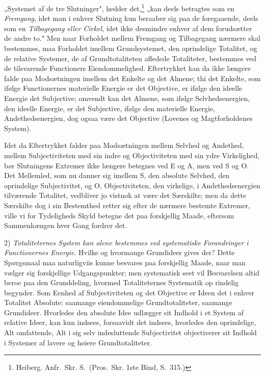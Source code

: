 \documentclass[12pt]{book}
\newcommand{\opage}[1]{\marginnote{\footnotesize\textit{[#1]}}}
\newcommand{\apage}[1]{\marginnote{\footnotesize\textit{[#1]}}}
\begin{document}
„Systemet af de tre Slutninger", hedder det,\footnote{Heiberg. Anfr.\ Skr. S.\ (Pros.\ Skr. 1ste
Bind, S.~315.)} „kan deels
\opage{434} betragtes som en \emph{Fremgang}, idet man i enhver Slutning kun beraaber sig paa de foregaaende,
deels som en \emph{Tilbagegang eller Cirkel}, idet ikke desmindre enhver af dem forudsætter de andre
to." Men naar Forholdet mellem Fremgang og Tilbagegang nærmere skal bestemmes, maa Forholdet imellem
Grundsystemet, den oprindelige Totalitet, og de relative Systemer, de af Grundtotaliteten afledede
Totaliteter, bestemmes ved de tilsvarende Functioners Eiendommelighed. Eftertrykket kan da ikke
længere falde paa Modsætningen imellem det Enkelte og det Almene; thi det Enkelte, som ifølge
Functionernes materielle Energie er det Objective, er ifølge den ideelle Energie det Subjective;
omvendt kan det Almene, som ifølge Selvhedsenergien, den ideelle Energie, er det Subjective, ifølge
den materielle Energie, Andethedsenergien, dog ogsaa være det Objective (Lovenes og
Magtforholdenes System).

Idet da Eftertrykket falder paa Modsætningen mellem Selvhed og Andethed, mellem Subjectiviteten med
sin indre og Objectiviteten med sin ydre Virkelighed, bør Slutningens Extremer ikke længere betegnes
ved E og A, men ved S og O. Det Mellemled, som nu danner sig imellem S, den absolute Selvhed, den
oprindelige Subjectivitet, og O, Objectiviteten, den virkelige, i Andethedsenergien tilværende
Totalitet, vedbliver jo vistnok at være det Særskilte; men da dette Særskilte dog i sin Bestemthed
retter sig efter de nærmere bestemte Extremer, ville vi for Tydeligheds Skyld betegne det paa
forskjellig Maade, eftersom Sammenhængen hver Gang fordrer det.

2) \emph{Totaliteternes System kan alene bestemmes ved systematiske Forandringer i Functionernes
Energie}. Hvilke og hvormange Grundideer gives der? Dette Spørgsmaal maa naturligviis kunne besvares
paa forskjellig Maade, naar man vælger sig forskjellige Udgangspunkter; men systematisk seet vil
Besvarelsen altid beroe paa den Grunddeling, hvormed Totaliteternes Systematik \apage{435} op\-%
rindelig begynder. Som Eenhed af Subjectiviteten og det Objective er Ideen det i enhver Totalitet
Absolute: saamange eiendommelige Grundtotaliteter, saamange Grundideer. Hvorledes den absolute Idee
udlægger sit Indhold i et System af relative Ideer, kan kun indsees, forsaavidt det indsees, hvorledes
den oprindelige, Alt omfattende, Alt i sig selv indesluttende Subjectivitet objectiverer sit Indhold i
Systemer af lavere og høiere Grundtotaliteter.
\end{document}
